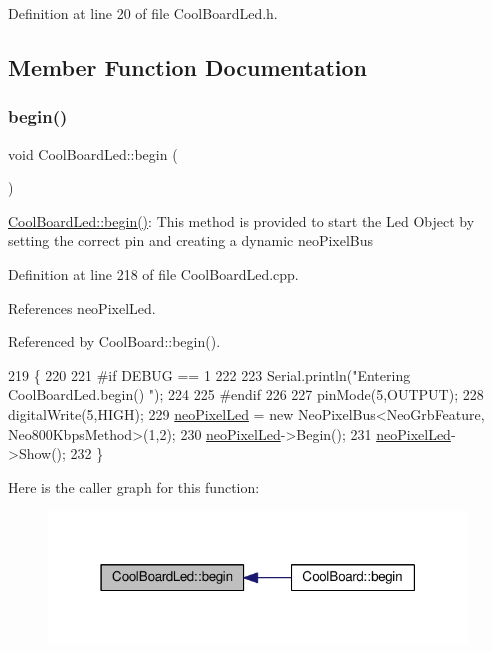Definition at line 20 of file Cool\+Board\+Led.\+h.



\subsection{Member Function Documentation}
\mbox{\label{classCoolBoardLed_ae3cbde8affcc6f011cbd698c8ef911f6}} 
\subsubsection{\texorpdfstring{begin()}{begin()}}
{\footnotesize\ttfamily void Cool\+Board\+Led\+::begin (\begin{DoxyParamCaption}{ }\end{DoxyParamCaption})}

\hyperlink{classCoolBoardLed_ae3cbde8affcc6f011cbd698c8ef911f6}{Cool\+Board\+Led\+::begin()}\+: This method is provided to start the Led Object by setting the correct pin and creating a dynamic neo\+Pixel\+Bus 

Definition at line 218 of file Cool\+Board\+Led.\+cpp.



References neo\+Pixel\+Led.



Referenced by Cool\+Board\+::begin().


\begin{DoxyCode}
219 \{
220 
221 \textcolor{preprocessor}{#if DEBUG == 1}
222 
223     Serial.println(\textcolor{stringliteral}{"Entering CoolBoardLed.begin() "});
224 
225 \textcolor{preprocessor}{#endif}
226 
227     pinMode(5,OUTPUT);
228     digitalWrite(5,HIGH);
229     \hyperlink{classCoolBoardLed_ac2c13fa462a010cd9242bf297c013923}{neoPixelLed} = \textcolor{keyword}{new} NeoPixelBus<NeoGrbFeature, Neo800KbpsMethod>(1,2); 
230     \hyperlink{classCoolBoardLed_ac2c13fa462a010cd9242bf297c013923}{neoPixelLed}->Begin();
231     \hyperlink{classCoolBoardLed_ac2c13fa462a010cd9242bf297c013923}{neoPixelLed}->Show();
232 \} 
\end{DoxyCode}
Here is the caller graph for this function\+:\nopagebreak
\begin{figure}[H]
\begin{center}
\leavevmode
\includegraphics[width=315pt]{classCoolBoardLed_ae3cbde8affcc6f011cbd698c8ef911f6_icgraph}
\end{center}
\end{figure}
\mbox{\label{classCoolBoardLed_a27706bc029f6a126c55d0b91624ad7fa}} 
